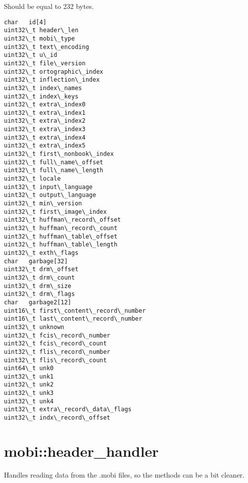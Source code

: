 \documentclass[letterpaper,10pt,english]{sphinxmanual}
\begin{document}

\begin{fulllineitems}
\label{headers:st_mobi}
Should be equal to 232 bytes.

\begin{Verbatim}[commandchars=\\\{\}]
char   id[4]
uint32\_t header\_len
uint32\_t mobi\_type
uint32\_t text\_encoding
uint32\_t u\_id
uint32\_t file\_version
uint32\_t ortographic\_index
uint32\_t inflection\_index
uint32\_t index\_names
uint32\_t index\_keys
uint32\_t extra\_index0
uint32\_t extra\_index1
uint32\_t extra\_index2
uint32\_t extra\_index3
uint32\_t extra\_index4
uint32\_t extra\_index5
uint32\_t first\_nonbook\_index
uint32\_t full\_name\_offset
uint32\_t full\_name\_length
uint32\_t locale
uint32\_t input\_language
uint32\_t output\_language
uint32\_t min\_version
uint32\_t first\_image\_index
uint32\_t huffman\_record\_offset
uint32\_t huffman\_record\_count
uint32\_t huffman\_table\_offset
uint32\_t huffman\_table\_length
uint32\_t exth\_flags
char   garbage[32]
uint32\_t drm\_offset
uint32\_t drm\_count
uint32\_t drm\_size
uint32\_t drm\_flags
char   garbage2[12]
uint16\_t first\_content\_record\_number
uint16\_t last\_content\_record\_number
uint32\_t unknown
uint32\_t fcis\_record\_number
uint32\_t fcis\_record\_count
uint32\_t flis\_record\_number
uint32\_t flis\_record\_count
uint64\_t unk0
uint32\_t unk1
uint32\_t unk2
uint32\_t unk3
uint32\_t unk4
uint32\_t extra\_record\_data\_flags
uint32\_t indx\_record\_offset
\end{Verbatim}

\end{fulllineitems}



\section{mobi::header\_handler}
\label{header_handler:mobi-header-handler}\label{header_handler::doc}

\begin{fulllineitems}
\label{header_handler:header_handler}
Handles reading data from the .mobi files, so the {\hyperref[mobireader:mobi::mobireader]{}}
methods can be a bit cleaner.

\end{fulllineitems}
\end{document}
